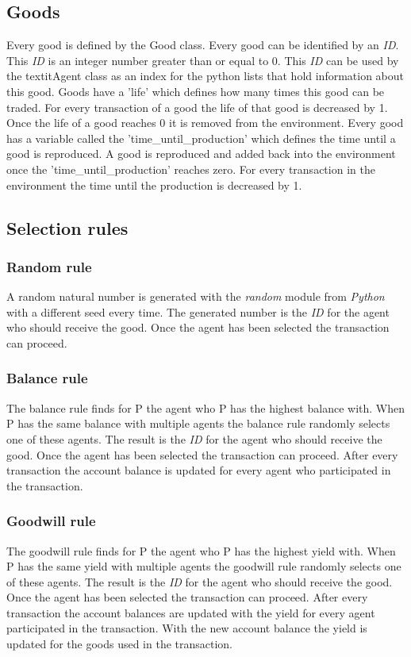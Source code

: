 \documentclass[twoside,openright]{uva-bachelor-thesis}
\begin{document}
\subsection{Goods}
Every good is defined by the Good class. Every good can be identified by an \textit{ID}. This \textit{ID} is an integer number greater than or equal to 0. This \textit{ID} can be used by the textit{Agent} class as an index for the python lists that hold information about this good. Goods have a 'life' which defines how many times this good can be traded. For every transaction of a good the life of that good is decreased by 1. Once the life of a good reaches 0 it is removed from the environment. Every good has a variable called the 'time\_until\_production' which defines the time until a good is reproduced. A good is reproduced and added back into the environment once the 'time\_until\_production' reaches zero. For every transaction in the environment the time until the production is decreased by 1.

\subsection{Selection rules}

\subsubsection{Random rule}
A random natural number is generated with the \textit{random} module from \textit{Python} with a different seed every time. The generated number is the \textit{ID} for the agent who should receive the good. Once the agent has been selected the transaction can proceed.

\subsubsection{Balance rule}
The balance rule finds for P the agent who P has the highest balance with. When P has the same balance with multiple agents the balance rule randomly selects one of these agents. The result is the \textit{ID} for the agent who should receive the good. Once the agent has been selected the transaction can proceed. After every transaction the account balance is updated for every agent who participated in the transaction.

\subsubsection{Goodwill rule}
The goodwill rule finds for P the agent who P has the highest yield with. When P has the same yield with multiple agents the goodwill rule randomly selects one of these agents. The result is the \textit{ID} for the agent who should receive the good. Once the agent has been selected the transaction can proceed. After every transaction the account balances are updated with the yield for every agent participated in the transaction. With the new account balance the yield is updated for the goods used in the transaction.
\end{document}
